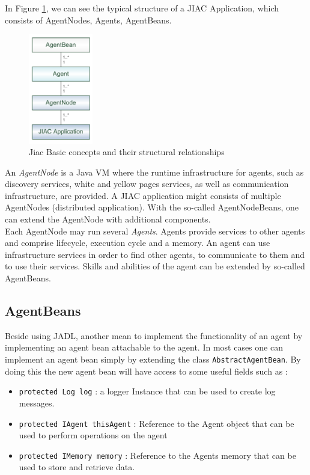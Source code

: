In Figure \ref{fig:jiac_basic}, we can see the typical structure of a JIAC Application, which consists of AgentNodes, Agents, AgentBeans.
\begin{figure}[h]
	\centering
		\includegraphics[width=0.25\textwidth]{images/jiac_basic.png}
		\caption{Jiac Basic concepts and their structural relationships \cite{JIACMAN10}}
	\label{fig:jiac_basic}
\end{figure}
An \textit{AgentNode} is a Java VM where the runtime infrastructure for agents, such as discovery services, white and yellow pages services, as well as communication infrastructure, are provided. A JIAC application might consists of multiple AgentNodes (distributed application). With the so-called AgentNodeBeans, one can extend the AgentNode with additional components.\\

Each AgentNode may run several \textit{Agents}. Agents provide services to other agents
and comprise lifecycle, execution cycle and a memory. An agent can use infrastructure
services in order to find other agents, to communicate to them and to use their services.
Skills and abilities of the agent can be extended by so-called AgentBeans.\\


\subsection{AgentBeans}
Beside using JADL, another mean to implement the functionality of an agent by implementing an agent bean attachable to the agent.
In most cases one can implement an agent bean simply by extending the class \texttt{AbstractAgentBean}. By doing this the new agent bean will have access to some useful fields such as :
\begin{itemize}
	\item \texttt{protected Log log} : a logger Instance that can be used to create log messages.
	\item \texttt{protected IAgent thisAgent} : Reference to the Agent object that can be used to perform operations on the agent
	\item \texttt{protected IMemory memory} : Reference to the Agents memory that can be used to store and retrieve data.
\end{itemize}


